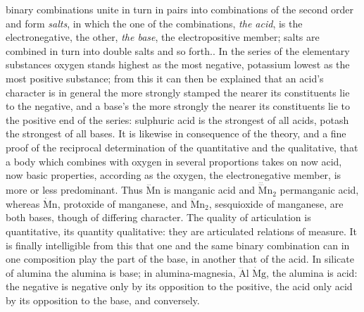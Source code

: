 \documentclass[12pt,a4paper]{book}
\begin{document}
binary combinations unite in turn in pairs into combinations of the second order and form \emph{salts}, in which the one
of the combinations, \emph{the acid}, is the electronegative, the other, \emph{the base}, the electropositive member;
salts are combined in turn into double salts and so forth.. In the series of the elementary substances oxygen stands
highest as the most negative, potassium lowest as the most positive substance; from this it can then be explained that an
acid's character is in general the more strongly stamped the nearer its constituents lie to the negative, and a base's
the more strongly the nearer its constituents lie to the positive end of the series: sulphuric acid is the strongest of
all acids, potash the strongest of all bases. It is likewise in consequence of the theory, and a fine proof of the
reciprocal determination of the quantitative and the qualitative, that a body which combines with oxygen in several
proportions takes on now acid, now basic properties, according as the oxygen, the electronegative member, is more or
less predominant. Thus $\dddot{\mathrm{M}}\mathrm{n}$ is manganic acid and
$\dddot{\ddddot{\mathrm{M}}}\!\mathrm{n}_2$ permanganic acid, whereas $\dot{\mathrm{M}}\mathrm{n}$, protoxide of
manganese, and $\dddot{\mathrm{M}}\mathrm{n}_2$, sesquioxide of manganese, are both bases, though of differing
character. The quality of articulation is quantitative, its quantity qualitative: they are articulated relations of
measure. It is finally intelligible from this that one and the same binary combination can in one composition play the
part of the base, in another that of the acid. In silicate of alumina the alumina is base; in alumina-magnesia,
$\dddot{\mathrm{A}}\mathrm{l}$ $\dot{\mathrm{M}}\mathrm{g}$, the alumina is acid: the negative is negative only by its
opposition to the positive, the acid only acid by its opposition to the base, and conversely.
\end{document}
